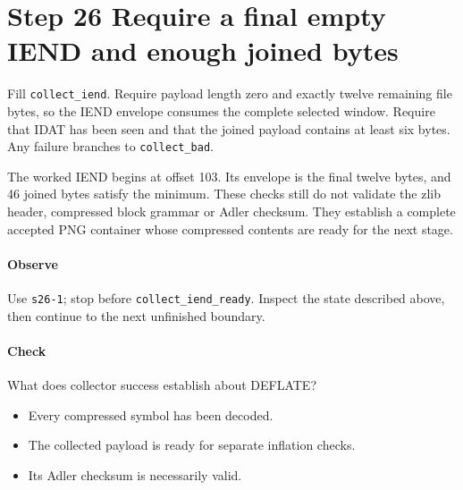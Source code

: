 \section{Step 26 Require a final empty IEND and enough joined bytes}\label{png-collect-s26}
Fill \texttt{collect\_iend}. Require payload length zero and exactly twelve remaining file bytes, so the IEND envelope consumes the complete selected window. Require that IDAT has been seen and that the joined payload contains at least six bytes. Any failure branches to \texttt{collect\_bad}.

The worked IEND begins at offset 103. Its envelope is the final twelve bytes, and 46 joined bytes satisfy the minimum. These checks still do not validate the zlib header, compressed block grammar or Adler checksum. They establish a complete accepted PNG container whose compressed contents are ready for the next stage.

\paragraph{Observe} Use \texttt{s26-1}; stop before \texttt{collect\_iend\_ready}. Inspect the state described above, then continue to the next unfinished boundary.

\paragraph{Check} What does collector success establish about DEFLATE?
\begin{itemize}
\item[A.] Every compressed symbol has been decoded.
\item[B.] The collected payload is ready for separate inflation checks.
\item[C.] Its Adler checksum is necessarily valid.
\end{itemize}
